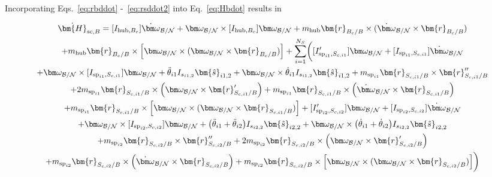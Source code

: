 Incorporating Eqs.~\eqref{eq:rbddot} -~\eqref{eq:rsddot2} into Eq.~\eqref{eq:Hbdot} results in

\begin{multline}
	\dot{\bm{H}}_{\text{sc},B} = [I_{\text{hub},B_c}] \dot{\bm\omega}_{\cal B/N} + \bm\omega_{\cal B/N} \times [I_{\text{hub},B_c}] \bm\omega_{\cal B/N} + m_{\text{hub}} \bm{r}_{B_c/B}\times ( \dot{\bm\omega}_{\cal B/N}\times \bm{r}_{B_c/B}) \\+ m_{\text{hub}} \bm{r}_{B_c/B}\times\Big[\bm\omega_{\cal B/N} \times (\bm\omega_{\cal B/N} \times \bm{r}_{B_c/B})\Big] +\sum\limits_{i=1}^{N_S} \biggl( [I'_{\text{sp}_{i1},S_{c,i1}}] \bm\omega_{\cal B/N} + [I_{\text{sp}_{i1},S_{c,i1}}] \dot{\bm\omega}_{\cal B/N} \\+ \bm\omega_{\cal B/N} \times [I_{\text{sp}_{i1},S_{c,i1}}] \bm\omega_{\cal B/N}
	+ \ddot{\theta}_{i1} I_{s_{i1,2}}\bm{\hat{s}}_{i1,2}+ \bm\omega_{\cal B/N} \times \dot{\theta}_{i1} I_{s_{i1,2}}\bm{\hat{s}}_{i1,2}
	+m_{\text{sp}_{i1}} \bm{r}_{S_{c,i1}/B} \times \bm{r}''_{S_{c,i1}/B}\\ + 2 m_{\text{sp}_{i1}} \bm{r}_{S_{c,i1}/B} \times \Big( \bm\omega_{\cal B/N} \times \bm{r}'_{S_{c,i1}/B}\Big)
	+m_{\text{sp}_{i1}} \bm{r}_{S_{c,i1}/B} \times \Big( \dot{\bm\omega}_{\cal B/N} \times \bm{r}_{S_{c,i1}/B}\Big) \\+m_{\text{sp}_{i1}} \bm{r}_{S_{c,i1}/B} \times \Big[ \bm\omega_{\cal B/N} \times (\bm\omega_{\cal B/N} \times \bm{r}_{S_{c,i1}/B})\Big]
	+ [I'_{\text{sp}_{i2},S_{c,i2}}] \bm\omega_{\cal B/N} + [I_{\text{sp}_{i2},S_{c,i2}}] \dot{\bm\omega}_{\cal B/N} \\+ \bm\omega_{\cal B/N} \times [I_{\text{sp}_{i2},S_{c,i2}}] \bm\omega_{\cal B/N}
	+ \big(\ddot{\theta}_{i1} + \ddot{\theta}_{i2}\big) I_{s_{i2,2}}\bm{\hat{s}}_{i2,2}+ \bm\omega_{\cal B/N} \times \big(\dot{\theta}_{i1} + \dot{\theta}_{i2}\big) I_{s_{i2,2}}\bm{\hat{s}}_{i2,2} \\
	+m_{\text{sp}_{i2}} \bm{r}_{S_{c,i2}/B} \times \bm{r}''_{S_{c,i2}/B} + 2 m_{\text{sp}_{i2}} \bm{r}_{S_{c,i2}/B} \times \Big(\bm\omega_{\cal B/N} \times \bm{r}'_{S_{c,i2}/B}\Big)\\
	+m_{\text{sp}_{i2}} \bm{r}_{S_{c,i2}/B} \times \Big(\dot{\bm\omega}_{\cal B/N} \times \bm{r}_{S_{c,i2}/B}\Big) +m_{\text{sp}_{i2}} \bm{r}_{S_{c,i2}/B} \times \Big[\bm\omega_{\cal B/N} \times (\bm\omega_{\cal B/N} \times \bm{r}_{S_{c,i2}/B})\Big]\biggr)
	\label{eq:Hbdot3}
\end{multline}

